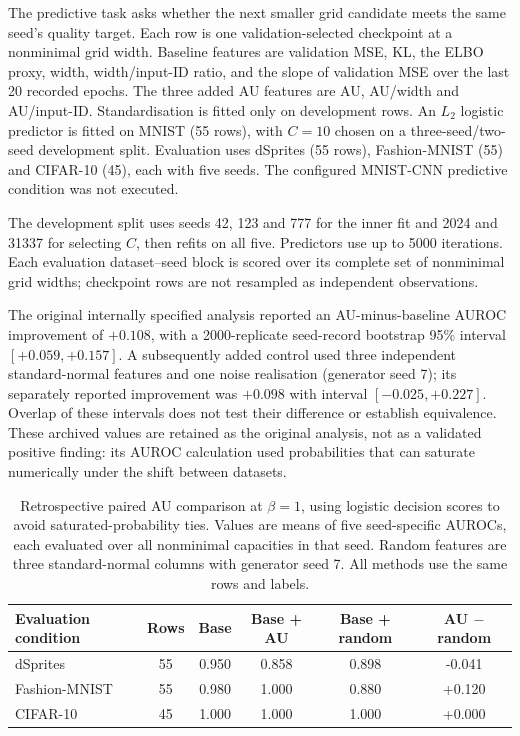 \documentclass[make,article,submit,pdftex,moreauthors]{Definitions/mdpi}
\begin{document}
The predictive task asks whether the next smaller grid candidate meets
the same seed's quality target. Each row is one validation-selected
checkpoint at a nonminimal grid width. Baseline features are validation
MSE, KL, the ELBO proxy, width, width/input-ID ratio, and the slope of
validation MSE over the last 20 recorded epochs. The three added AU
features are AU, AU/width and AU/input-ID. Standardisation is fitted
only on development rows. An $L_2$ logistic predictor is fitted on
MNIST (55 rows), with $C=10$ chosen on a three-seed/two-seed
development split. Evaluation uses dSprites (55 rows), Fashion-MNIST
(55) and CIFAR-10 (45), each with five seeds. The configured
MNIST-CNN predictive condition was not executed.

The development split uses seeds 42, 123 and 777 for the inner fit and
2024 and 31337 for selecting $C$, then refits on all five. Predictors use
up to 5000 iterations. Each evaluation dataset--seed block is scored
over its complete set of nonminimal grid widths; checkpoint rows are
not resampled as independent observations.

The original internally specified analysis reported an AU-minus-baseline
AUROC improvement of $+0.108$, with a 2000-replicate seed-record bootstrap
95\% interval $[+0.059,+0.157]$. A subsequently added control used
three independent standard-normal features and one noise realisation
(generator seed 7); its separately reported improvement was $+0.098$
with interval $[-0.025,+0.227]$. Overlap of these intervals does not test
their difference or establish equivalence. These archived values are
retained as the original analysis, not as a validated positive finding:
its AUROC calculation used probabilities that can saturate numerically
under the shift between datasets.

\begin{table}[H]
\caption{Retrospective paired AU comparison at $\beta=1$, using logistic decision scores to avoid saturated-probability ties. Values are means of five seed-specific AUROCs, each evaluated over all nonminimal capacities in that seed. Random features are three standard-normal columns with generator seed 7. All methods use the same rows and labels.}\label{tab:au}
\footnotesize
\setlength{\tabcolsep}{3.5pt}
\begin{tabular*}{\textwidth}{@{\extracolsep{\fill}}lccccc@{}}
\toprule
Evaluation condition & Rows & Base & Base + AU & Base + random & AU $-$ random \\
\midrule
dSprites & 55 & 0.950 & 0.858 & 0.898 & -0.041 \\
Fashion-MNIST & 55 & 0.980 & 1.000 & 0.880 & +0.120 \\
CIFAR-10 & 45 & 1.000 & 1.000 & 1.000 & +0.000 \\
\bottomrule
\end{tabular*}
\end{table}
\end{document}
